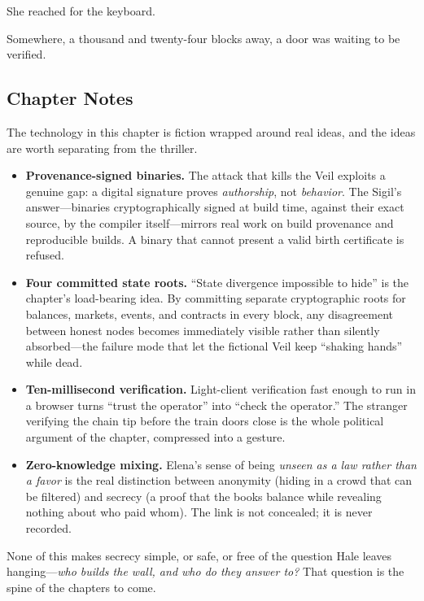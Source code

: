 \documentclass[12pt,letterpaper]{book}
\begin{document}
She reached for the keyboard.

Somewhere, a thousand and twenty-four blocks away, a door was waiting to be verified.

\hypertarget{chapter-6-notes}{%
\subsection{Chapter Notes}\label{chapter-6-notes}}

The technology in this chapter is fiction wrapped around real ideas, and the
ideas are worth separating from the thriller.

\begin{itemize}
\item
  \textbf{Provenance-signed binaries.} The attack that kills the Veil exploits
  a genuine gap: a digital signature proves \emph{authorship}, not
  \emph{behavior}. The Sigil's answer---binaries cryptographically signed at
  build time, against their exact source, by the compiler itself---mirrors real
  work on build provenance and reproducible builds. A binary that cannot
  present a valid birth certificate is refused.
\item
  \textbf{Four committed state roots.} ``State divergence impossible to hide''
  is the chapter's load-bearing idea. By committing separate cryptographic
  roots for balances, markets, events, and contracts in every block, any
  disagreement between honest nodes becomes immediately visible rather than
  silently absorbed---the failure mode that let the fictional Veil keep
  ``shaking hands'' while dead.
\item
  \textbf{Ten-millisecond verification.} Light-client verification fast enough
  to run in a browser turns ``trust the operator'' into ``check the operator.''
  The stranger verifying the chain tip before the train doors close is the
  whole political argument of the chapter, compressed into a gesture.
\item
  \textbf{Zero-knowledge mixing.} Elena's sense of being \emph{unseen as a law
  rather than a favor} is the real distinction between anonymity (hiding in a
  crowd that can be filtered) and secrecy (a proof that the books balance while
  revealing nothing about who paid whom). The link is not concealed; it is
  never recorded.
\end{itemize}

None of this makes secrecy simple, or safe, or free of the question Hale
leaves hanging---\emph{who builds the wall, and who do they answer to?} That
question is the spine of the chapters to come.
\end{document}
